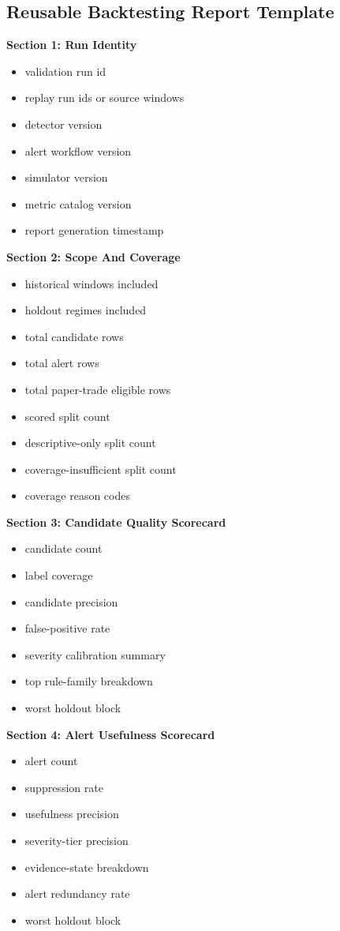 \documentclass{article}
\begin{document}
\subsection*{Reusable Backtesting Report Template}

\textbf{Section 1: Run Identity}
\begin{itemize}
\item validation run id
\item replay run ids or source windows
\item detector version
\item alert workflow version
\item simulator version
\item metric catalog version
\item report generation timestamp
\end{itemize}

\textbf{Section 2: Scope And Coverage}
\begin{itemize}
\item historical windows included
\item holdout regimes included
\item total candidate rows
\item total alert rows
\item total paper-trade eligible rows
\item scored split count
\item descriptive-only split count
\item coverage-insufficient split count
\item coverage reason codes
\end{itemize}

\textbf{Section 3: Candidate Quality Scorecard}
\begin{itemize}
\item candidate count
\item label coverage
\item candidate precision
\item false-positive rate
\item severity calibration summary
\item top rule-family breakdown
\item worst holdout block
\end{itemize}

\textbf{Section 4: Alert Usefulness Scorecard}
\begin{itemize}
\item alert count
\item suppression rate
\item usefulness precision
\item severity-tier precision
\item evidence-state breakdown
\item alert redundancy rate
\item worst holdout block
\end{itemize}
\end{document}
